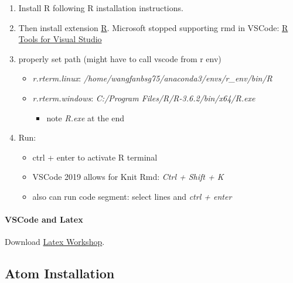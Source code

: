\documentclass[]{article}
\providecommand{\tightlist}{%
  \setlength{\itemsep}{0pt}\setlength{\parskip}{0pt}}
\let\oldparagraph\paragraph
\renewcommand{\paragraph}[1]{\oldparagraph{#1}\mbox{}}
\begin{document}
\begin{enumerate}
\def\labelenumi{\arabic{enumi}.}
\tightlist
\item
  Install R following R installation instructions.
\item
  Then install extension
  \href{https://marketplace.visualstudio.com/items?itemName=Ikuyadeu.r}{R}.
  Microsoft stopped supporting rmd in VSCode:
  \href{https://github.com/microsoft/RTVS}{R Tools for Visual Studio}
\item
  properly set path (might have to call vscode from r env)

  \begin{itemize}
  \tightlist
  \item
    \emph{r.rterm.linux}:
    \emph{/home/wangfanbsg75/anaconda3/envs/r\_env/bin/R}
  \item
    \emph{r.rterm.windows}: \emph{C:/Program
    Files/R/R-3.6.2/bin/x64/R.exe}

    \begin{itemize}
    \tightlist
    \item
      note \emph{R.exe} at the end
    \end{itemize}
  \end{itemize}
\item
  Run:

  \begin{itemize}
  \tightlist
  \item
    ctrl + enter to activate R terminal
  \item
    VSCode 2019 allows for Knit Rmd: \emph{Ctrl + Shift + K}
  \item
    also can run code segment: select lines and \emph{ctrl + enter}
  \end{itemize}
\end{enumerate}

\hypertarget{vscode-and-latex}{%
\paragraph{VSCode and Latex}\label{vscode-and-latex}}

Download
\href{https://marketplace.visualstudio.com/items?itemName=James-Yu.latex-workshop}{Latex
Workshop}.

\hypertarget{atom-installation}{%
\subsection{Atom Installation}\label{atom-installation}}
\end{document}
